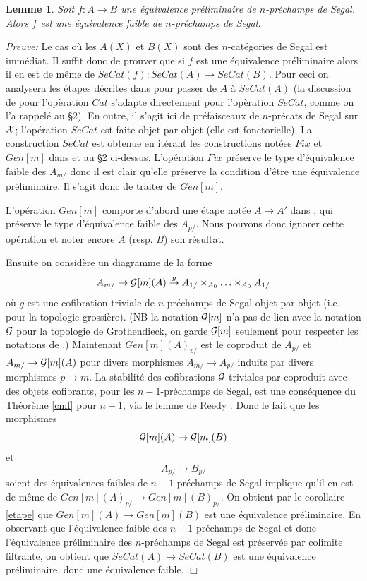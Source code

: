 \documentclass[12pt]{article}
\newcommand{\eop}{\hfill $\Box$\vspace{.1in}}
\newtheorem{lemme}[lemma]{Lemme}
\newcommand{\Gg}{{\cal G}}
\newcommand{\Xx}{{\cal X}}
\begin{document}
\begin{lemme}
\label{etape2}
Soit $f: A\rightarrow B$ une \'equivalence pr\'eliminaire de $n$-pr\'echamps de
Segal.
Alors $f$ est une \'equivalence faible de $n$-pr\'echamps de Segal.
\end{lemme}
{\em Preuve:}
Le cas o\`u les $A(X)$ et $B(X)$ sont des
$n$-cat\'egories de Segal est imm\'ediat. Il
suffit donc de prouver que si $f$ est une \'equivalence pr\'eliminaire alors
il en est de m\^eme de $SeCat(f): SeCat(A)\rightarrow SeCat(B)$. Pour ceci on
analysera les \'etapes d\'ecrites dans \cite{nCAT} pour passer de $A$ \`a
$SeCat(A)$ (la discussion de \cite{nCAT} pour l'op\`eration $Cat$ s'adapte
directement pour l'op\`eration $SeCat$, comme on l'a rappel\'e au \S 2).
En outre,  il s'agit ici
de pr\'efaisceaux de $n$-pr\'ecats de Segal sur $\Xx$;
l'op\'eration $SeCat$ est faite objet-par-objet (elle est fonctorielle). La
construction $SeCat$ est obtenue en it\'erant les constructions not\'ees
$Fix$ et
$Gen[m]$ dans \cite{nCAT} et au \S 2 ci-dessus.
L'op\'eration $Fix$ pr\'eserve le
type d'\'equivalence
faible des $A_{m/}$ donc il est clair qu'elle pr\'eserve la condition
d'\^etre une
\'equivalence pr\'eliminaire. Il s'agit donc de traiter de $Gen[m]$.

L'op\'eration $Gen[m]$ comporte d'abord une \'etape not\'ee $A\mapsto A'$ dans
\cite{nCAT}, qui pr\'eserve le type d'\'equivalence faible des $A_{p/}$. Nous
pouvons donc ignorer cette op\'eration et noter encore  $A$ (resp. $B$) son
r\'esultat.

Ensuite on consid\`ere un diagramme de la forme
$$
A_{m/} \rightarrow \Gg [m](A) \stackrel{g}{\rightarrow }
A_{1/}\times _{A_0} \ldots \times _{A_0} A_{1/}
$$
o\`u $g$ est une cofibration triviale de $n$-pr\'echamps de Segal
objet-par-objet (i.e. pour la topologie grossi\`ere). (NB la notation
$\Gg [m]$ n'a pas de lien avec la notation $\Gg$ pour la topologie de
Grothendieck, on garde $\Gg [m]$ seulement pour respecter les
notations de \cite{nCAT}.) Maintenant $Gen[m](A)_{p/}$ est le coproduit de
$A_{p/}$ et $A_{m/}\rightarrow \Gg [m](A)$ pour divers morphismes
$A_{m/}\rightarrow A_{p/}$ induits par divers morphismes $p\rightarrow
m$.
La stabilit\'e des cofibrations $\Gg$-triviales par
coproduit avec des objets cofibrants, pour les $n-1$-pr\'echamps de Segal,
est une
cons\'equence du Th\'eor\`eme \ref{cmf} pour $n-1$, via le lemme de Reedy
\cite{Reedy}.
Donc le fait que les morphismes
$$
\Gg [m](A)\rightarrow \Gg [m](B)
$$
et
$$
A_{p/} \rightarrow B_{p/}
$$
soient des \'equivalences faibles de $n-1$-pr\'echamps de Segal implique
qu'il en
est de m\^eme de  $Gen[m](A)_{p/}\rightarrow Gen[m](B)_{p/}$. On obtient par le
corollaire \ref{etape} que $Gen[m](A)\rightarrow Gen[m](B)$ est une
\'equivalence pr\'eliminaire. En observant que l'\'equivalence faible des
$n-1$-pr\'echamps de Segal et donc l'\'equivalence pr\'eliminaire des
$n$-pr\'echamps
de Segal est pr\'eserv\'ee par  colimite filtrante,
on obtient que
$SeCat(A)\rightarrow SeCat(B)$ est une \'equivalence pr\'eliminaire,
donc une
\'equivalence faible.
\eop
\end{document}
